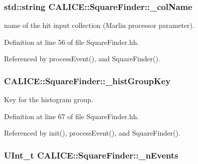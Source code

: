 \subsubsection[{\-\_\-col\-Name}]{\setlength{\rightskip}{0pt plus 5cm}std\-::string C\-A\-L\-I\-C\-E\-::\-Square\-Finder\-::\-\_\-col\-Name\hspace{0.3cm}{\ttfamily [protected]}}\label{classCALICE_1_1SquareFinder_a8f394987f130f4e495032fd256257ac0}


name of the hit input collection (Marlin processor parameter). 



Definition at line 56 of file Square\-Finder.\-hh.



Referenced by process\-Event(), and Square\-Finder().

\subsubsection[{\-\_\-hist\-Group\-Key}]{ C\-A\-L\-I\-C\-E\-::\-Square\-Finder\-::\-\_\-hist\-Group\-Key\hspace{0.3cm}{\ttfamily [private]}}\label{classCALICE_1_1SquareFinder_afb4241d90bc37018f6429aea7393fa90}


Key for the histogram group. 



Definition at line 67 of file Square\-Finder.\-hh.



Referenced by init(), process\-Event(), and Square\-Finder().

\subsubsection[{\-\_\-n\-Events}]{\setlength{\rightskip}{0pt plus 5cm}U\-Int\-\_\-t C\-A\-L\-I\-C\-E\-::\-Square\-Finder\-::\-\_\-n\-Events\hspace{0.3cm}{\ttfamily [protected]}}\label{classCALICE_1_1SquareFinder_a5110e34b92e02a21bf870ff104e59745}


